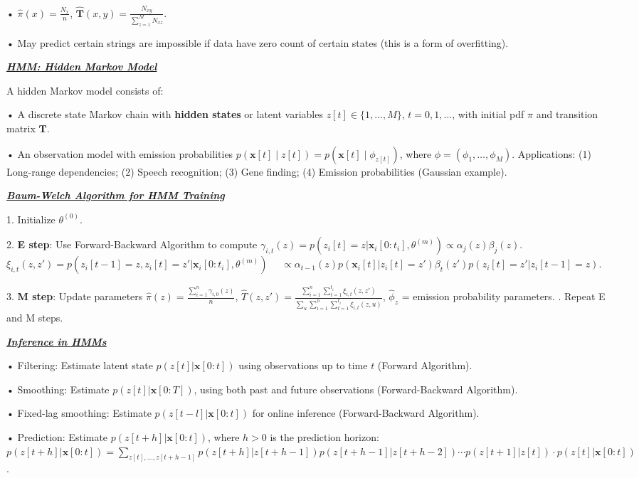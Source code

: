 \documentclass[10pt]{article}
\newcommand{\bulletPoint}[1]{\ul{\textit{\textbf{#1}}}}
\begin{document}
\begin{multicols*}{3}
• $\hat{\pi}(x) = \frac{N_x}{n}$, $\hat{\mathbf{T}}(x, y) = \frac{N_{xy}}{\sum_{z=1}^{M} N_{xz}}$. 
  
• May predict certain strings are impossible if data have zero count of certain states (this is a form of overfitting).

\bulletPoint{HMM: Hidden Markov Model}\quad

A hidden Markov model consists of:

• A discrete state Markov chain with \textbf{hidden states} or latent variables $z[t] \in \{1, \dots, M\}$, $t = 0,1,\dots$, with initial pdf $\pi$ and transition matrix $\mathbf{T}$.

• An observation model with emission probabilities $p(\mathbf{x}[t] \mid z[t]) = p(\mathbf{x}[t] \mid \phi_{z[t]})$, where $\phi = (\phi_1, \dots, \phi_M)$. 
Applications: 
(1) Long-range dependencies; 
(2) Speech recognition;
(3) Gene finding;
(4) Emission probabilities (Gaussian example). 

\bulletPoint{Baum-Welch Algorithm for HMM Training}\quad

1. Initialize $\theta^{(0)}$.

2. \textbf{E step}: Use Forward-Backward Algorithm to compute
    $\gamma_{i,t}(z) = p(z_i[t] = z | \mathbf{x}_i[0:t_i], \theta^{(m)}) \propto \alpha_j(z) \beta_j(z)$. 
    $\xi_{i,t}(z,z') = p(z_i[t-1] = z, z_i[t] = z' | \mathbf{x}_i[0:t_i], \theta^{(m)})$
    $\quad \propto \alpha_{t-1}(z) p(\mathbf{x}_i[t] | z_i[t]=z') \beta_t(z') p(z_i[t] = z' | z_i[t-1] = z)$. 

3. \textbf{M step}: Update parameters
    $\hat{\pi}(z) = \frac{\sum_{i=1}^{n} \gamma_{i,0}(z)}{n}$, 
    $\hat{T}(z,z') = \frac{\sum_{i=1}^{n} \sum_{t=1}^{t_i} \xi_{i,t}(z,z')}{\sum_u \sum_{i=1}^{n} \sum_{t=1}^{t_i} \xi_{i,t}(z,u)}$, 
    $\hat{\phi}_z$ = emission probability parameters. . Repeat E and M steps.
  
\bulletPoint{Inference in HMMs}\quad

• Filtering: Estimate latent state $p(z[t] | \mathbf{x}[0:t])$ using observations up to time $t$ ({Forward Algorithm}). 

• Smoothing: Estimate $p(z[t] | \mathbf{x}[0:T])$, using both past and future observations ({Forward-Backward Algorithm}). 

• Fixed-lag smoothing: Estimate $p(z[t-l] | \mathbf{x}[0:t])$ for online inference ({Forward-Backward Algorithm}). 

• Prediction: Estimate $p(z[t+h] | \mathbf{x}[0:t])$, where $h > 0$ is the prediction horizon:
$p(z[t+h] | \mathbf{x}[0:t]) = \sum_{z[t],...,z[t+h-1]} p(z[t+h] | z[t+h-1]) p(z[t+h-1] | z[t+h-2]) \cdots p(z[t+1] | z[t]) \cdot p(z[t] | \mathbf{x}[0:t])$. 


\end{multicols*}
\end{document}
